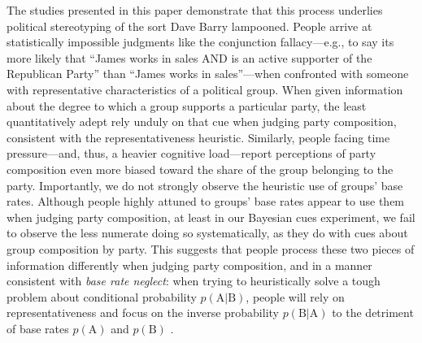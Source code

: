 \documentclass[12pt, letterpaper]{article}
\begin{document}
The studies presented in this paper demonstrate that this process underlies political stereotyping of the sort Dave Barry lampooned. People arrive at statistically impossible judgments like the conjunction fallacy---e.g., to say its more likely that ``James works in sales AND is an active supporter of the Republican Party'' than ``James works in sales''---when confronted with someone with representative characteristics of a political group. When given information about the degree to which a group supports a particular party, the least quantitatively adept rely unduly on that cue when judging party composition, consistent with the representativeness heuristic. Similarly, people facing time pressure---and, thus, a heavier cognitive load---report perceptions of party composition even more biased toward the share of the group belonging to the party. Importantly, we do not strongly observe the heuristic use of groups' base rates. Although people highly attuned to groups' base rates appear to use them when judging party composition, at least in our Bayesian cues experiment, we fail to observe the less numerate doing so systematically, as they do with cues about group composition by party. This suggests that people process these two pieces of information differently when judging party composition, and in a manner consistent with \emph{base rate neglect}: when trying to heuristically solve a tough problem about conditional probability $p(\text{A|B})$, people will rely on representativeness and focus on the inverse probability $p(\text{B|A})$ to the detriment of base rates $p(\text{A})$ and $p(\text{B})$ \citep{KahnemanFrederick2002}.
\end{document}
